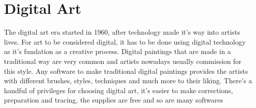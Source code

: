 \documentclass{report}
\begin{document}
\section{Digital Art}
\label{sec.digital.art}

The digital art era started in 1960, after technology made it's way into artists lives. For art to be considered digital, it has to be done using digital technology as it's fundation as a creative process. Digital paintings that are made in a traditional way are very common and artists nowadays usually commission for this style. Any software to make traditional digital paintings provides the artists with different brushes, styles, techniques and much more to their liking. There's a handful of privileges for choosing digital art, it's easier to make corrections, preparation and tracing, the supplies are free and so are many softwares
\end{document}
